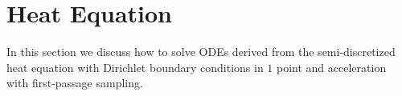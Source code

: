 \documentclass[a4paper,12pt]{article}
\begin{document}







\section{Heat Equation}

In this section we discuss how to solve ODEs derived from the semi-discretized heat equation
with Dirichlet boundary conditions in $1$ point and acceleration with first-passage sampling.

\end{document}
